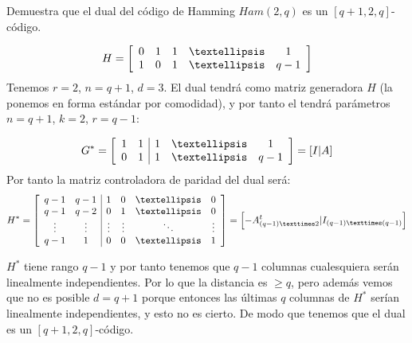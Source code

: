 \begin{problem}[15] Demuestra que el dual del código de Hamming $Ham(2,q)$
es un $[q+1,2,q]$-código.
\solution
{}

\[
	H = \left[
		\begin{array}{c c c c c}
			0 & 1 & 1 & … & 1\\
			1 & 0 & 1 & … & q-1
		\end{array}
	\right]
\]
Tenemos $r=2$, $n=q+1$, $d=3$. El dual tendrá como matriz generadora $H$ (la ponemos en forma estándar por comodidad), y por tanto el tendrá parámetros $n=q+1$, $k=2$, $r=q-1$:

\[
	G^* = \left[
		\begin{array}{c c | c c c}
			1 & 1 & 1 & … & 1\\
			0 & 1 & 1 & … & q-1
		\end{array}
	\right] = \left[ I | A \right]
\]
Por tanto la matriz controladora de paridad del dual será:
\[
	H^* = \left[
		\begin{array}{c c | c c c c}
			q-1 & q-1 & 1 & 0 & … & 0\\
			q-1 & q-2 & 0 & 1 & … & 0\\
			\vdots & \vdots & \vdots & \vdots & \ddots & \vdots\\
			q-1 & 1 & 0 & 0 & … & 1 
		\end{array}
	\right] = \left[ -A^t_{(q-1)×2} | I_{(q-1)×(q-1)} \right]
\]

$H^*$ tiene rango $q-1$ y por tanto tenemos que $q-1$ columnas cualesquiera serán linealmente independientes. Por lo que la distancia es $≥q$, pero además vemos que no es posible $d=q+1$ porque entonces las últimas $q$ columnas de $H^*$ serían linealmente independientes, y esto no es cierto. De modo que tenemos que el dual es un $[q+1,2,q]$-código.

\end{problem}


